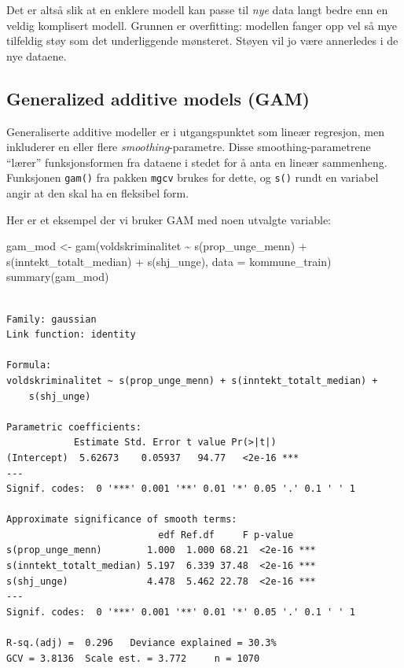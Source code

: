 \documentclass[
  letterpaper,
  DIV=11,
  numbers=noendperiod]{scrreprt}
\newenvironment{Shaded}{\begin{snugshade}}{\end{snugshade}}
\newcommand{\AttributeTok}[1]{\textcolor[rgb]{0.40,0.45,0.13}{#1}}
\newcommand{\FunctionTok}[1]{\textcolor[rgb]{0.28,0.35,0.67}{#1}}
\newcommand{\NormalTok}[1]{\textcolor[rgb]{0.00,0.23,0.31}{#1}}
\newcommand{\OtherTok}[1]{\textcolor[rgb]{0.00,0.23,0.31}{#1}}
\newcommand{\SpecialCharTok}[1]{\textcolor[rgb]{0.37,0.37,0.37}{#1}}
\begin{document}
Det er altså slik at en enklere modell kan passe til \emph{nye} data
langt bedre enn en veldig komplisert modell. Grunnen er overfitting:
modellen fanger opp vel så mye tilfeldig støy som det underliggende
mønsteret. Støyen vil jo være annerledes i de nye dataene.

\subsection{Generalized additive models
(GAM)}\label{generalized-additive-models-gam}

Generaliserte additive modeller er i utgangspunktet som lineær
regresjon, men inkluderer en eller flere \emph{smoothing}-parametre.
Disse smoothing-parametrene ``lærer'' funksjonsformen fra dataene i
stedet for å anta en lineær sammenheng. Funksjonen \texttt{gam()} fra
pakken \texttt{mgcv} brukes for dette, og \texttt{s()} rundt en variabel
angir at den skal ha en fleksibel form.

Her er et eksempel der vi bruker GAM med noen utvalgte variable:

\begin{Shaded}
\begin{Highlighting}[]
\NormalTok{gam\_mod }\OtherTok{\textless{}{-}} \FunctionTok{gam}\NormalTok{(voldskriminalitet }\SpecialCharTok{\textasciitilde{}} \FunctionTok{s}\NormalTok{(prop\_unge\_menn) }\SpecialCharTok{+} \FunctionTok{s}\NormalTok{(inntekt\_totalt\_median) }\SpecialCharTok{+} \FunctionTok{s}\NormalTok{(shj\_unge),}
               \AttributeTok{data =}\NormalTok{ kommune\_train)}
\FunctionTok{summary}\NormalTok{(gam\_mod)}
\end{Highlighting}
\end{Shaded}

\begin{verbatim}

Family: gaussian 
Link function: identity 

Formula:
voldskriminalitet ~ s(prop_unge_menn) + s(inntekt_totalt_median) + 
    s(shj_unge)

Parametric coefficients:
            Estimate Std. Error t value Pr(>|t|)    
(Intercept)  5.62673    0.05937   94.77   <2e-16 ***
---
Signif. codes:  0 '***' 0.001 '**' 0.01 '*' 0.05 '.' 0.1 ' ' 1

Approximate significance of smooth terms:
                           edf Ref.df     F p-value    
s(prop_unge_menn)        1.000  1.000 68.21  <2e-16 ***
s(inntekt_totalt_median) 5.197  6.339 37.48  <2e-16 ***
s(shj_unge)              4.478  5.462 22.78  <2e-16 ***
---
Signif. codes:  0 '***' 0.001 '**' 0.01 '*' 0.05 '.' 0.1 ' ' 1

R-sq.(adj) =  0.296   Deviance explained = 30.3%
GCV = 3.8136  Scale est. = 3.772     n = 1070
\end{verbatim}
\end{document}

